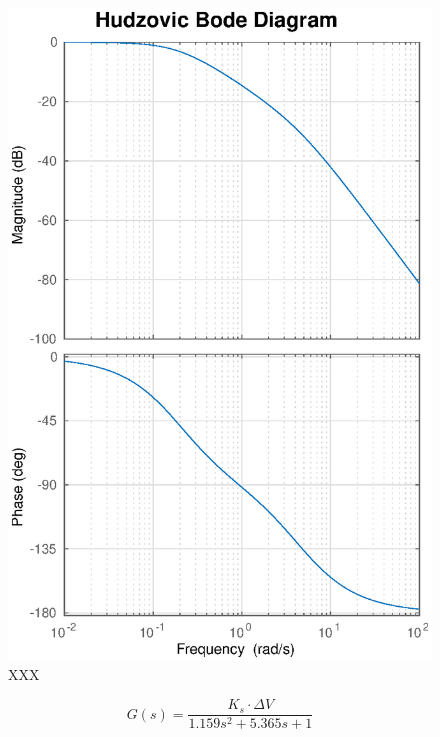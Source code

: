 \begin{figure}
    \centering
    \includegraphics[width=\linewidth]{images/hudzovic_bode}
    \caption{XXX}
\end{figure}

\begin{equation}
    G(s) = \frac{K_s \cdot \Delta V}{1.159 s^2 + 5.365 s + 1}
\end{equation}

